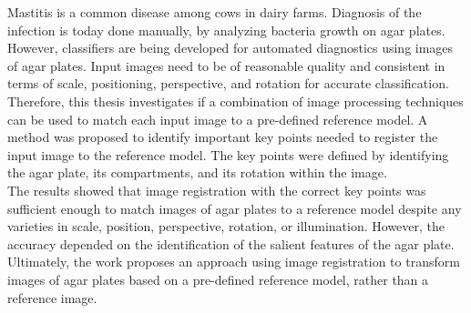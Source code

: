 \noindent Mastitis is a common disease among cows in dairy farms. Diagnosis of the infection is today done manually, by analyzing bacteria growth on agar plates. However, classifiers are being developed for automated diagnostics using images of agar plates. Input images need to be of reasonable quality and consistent in terms of scale, positioning, perspective, and rotation for accurate classification. Therefore, this thesis investigates if a combination of image processing techniques can be used to match each input image to a pre-defined reference model. A method was proposed to identify important key points needed to register the input image to the reference model. The key points were defined by identifying the agar plate, its compartments, and its rotation within the image. \\

\noindent The results showed that image registration with the correct key points was sufficient enough to match images of agar plates to a reference model despite any varieties in scale, position, perspective, rotation, or illumination. However, the accuracy depended on the identification of the salient features of the agar plate.  
Ultimately, the work proposes an approach using image registration to transform images of agar plates based on a pre-defined reference model, rather than a reference image. 

